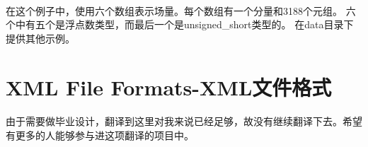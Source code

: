 \documentclass[UTF8]{ctexart}
\begin{document}
\paragraph{\quad}在这个例子中，使用六个数组表示场量。每个数组有一个分量和3188个元组。
                六个中有五个是浮点数类型，而最后一个是unsigned\_short类型的。
                在data目录下提供其他示例。

\section*{XML File Formats-XML文件格式}
\paragraph{\quad}由于需要做毕业设计，翻译到这里对我来说已经足够，故没有继续翻译下去。希望
                有更多的人能够参与进这项翻译的项目中。
\end{document}
